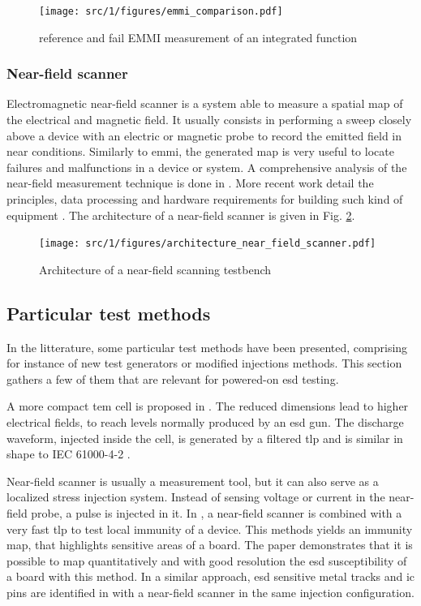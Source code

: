 \begin{figure}[!h]
  \centering
  \texttt{[image: src/1/figures/emmi\_comparison.pdf]}
  \caption{reference and fail EMMI measurement of an integrated function}
  \label{fig:emmi-examples}
\end{figure}


\subsubsection{Near-field scanner}

Electromagnetic near-field scanner is a system able to measure a spatial map of the electrical and magnetic field.
It usually consists in performing a sweep closely above a device with an electric or magnetic probe to record the emitted field in near conditions.
Similarly to \gls{emmi}, the generated map is very useful to locate failures and malfunctions in a device or system.
A comprehensive analysis of the near-field measurement technique is done in \cite{nfsFirstStudy}.
More recent work detail the principles, data processing and hardware requirements for building such kind of equipment \cite{planarNFSAntenna, NFSMeasurements, NFScanner}.
The architecture of a near-field scanner is given in Fig. \ref{fig:near-field-scanner}.

\begin{figure}[!h]
  \centering
  \texttt{[image: src/1/figures/architecture\_near\_field\_scanner.pdf]}
  \caption{Architecture of a near-field scanning testbench}
  \label{fig:near-field-scanner}
\end{figure}

\subsection{Particular test methods}

In the litterature, some particular test methods have been presented, comprising for instance of new test generators or modified injections methods.
This section gathers a few of them that are relevant for powered-on \gls{esd} testing.

A more compact \gls{tem} cell is proposed in \cite{SDRAMCase}.
The reduced dimensions lead to higher electrical fields, to reach levels normally produced by an \gls{esd} gun.
The discharge waveform, injected inside the cell, is generated by a filtered \gls{tlp} and is similar in shape to IEC 61000-4-2 \cite{iec61000-4-2}.

Near-field scanner is usually a measurement tool, but it can also serve as a localized stress injection system.
Instead of sensing voltage or current in the near-field probe, a pulse is injected in it.
In \cite{NearFieldInjectionFabrice}, a near-field scanner is combined with a very fast \gls{tlp} to test local immunity of a device.
This methods yields an immunity map, that highlights sensitive areas of a board.
The paper demonstrates that it is possible to map quantitatively and with good resolution the \gls{esd} susceptibility of a board with this method.
In a similar approach, \gls{esd} sensitive metal tracks and \gls{ic} pins are identified in \cite{NearFieldInjectionBis} with a near-field scanner in the same injection configuration.

